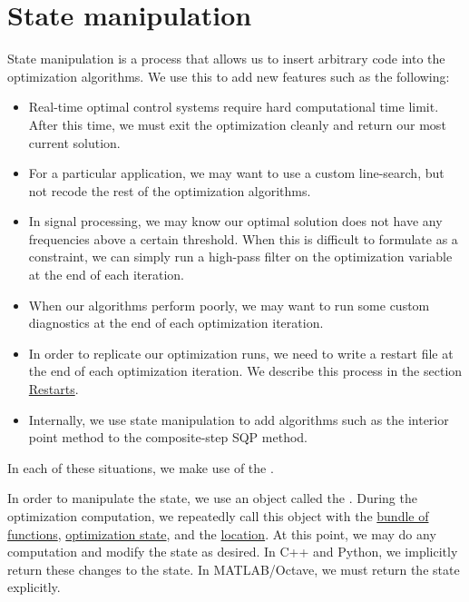 \documentclass{report}
\makeatletter
\DeclareRobustCommand*{\textct}[1]{%
  \begingroup\@activeus\scantokens{\texttt{#1}\endinput}\endgroup}
\newcommand{\textctref}[1]{\hyperref[itm:#1]{\textct{#1}}}
\newcommand{\secsmanip}{State manipulation}
\newcommand{\secrestart}{Restarts}
\makeatother
\begin{document}
\section{\secsmanip}\label{sec:smanip}

        State manipulation is a process that allows us to insert arbitrary code into the optimization algorithms.  We use this to add new features such as the following:
\begin{itemize}
    \item Real-time optimal control systems require hard computational time limit.  After this time, we must exit the optimization cleanly and return our most current solution.
    \item For a particular application, we may want to use a custom line-search, but not recode the rest of the optimization algorithms.
    \item In signal processing, we may know our optimal solution does not have any frequencies above a certain threshold.  When this is difficult to formulate as a constraint, we can simply run a high-pass filter on the optimization variable at the end of each iteration.
    \item When our algorithms perform poorly, we may want to run some custom diagnostics at the end of each optimization iteration.
    \item In order to replicate our optimization runs, we need to write a restart file at the end of each optimization iteration.  We describe this process in the section \hyperref[sec:restart]{\secrestart}.
    \item Internally, we use state manipulation to add algorithms such as the interior point method to the composite-step SQP method.
\end{itemize}
\noindent In each of these situations, we make use of the \textctref{StateManipulator}.

        In order to manipulate the state, we use an object called the \textctref{StateManipulator}.  During the optimization computation, we repeatedly call this object with the \hyperref[sec:fns]{bundle of functions}, \hyperref[sec:state]{optimization state}, and the \hyperref[itm:OptimizationLocation]{location}.  At this point, we may do any computation and modify the state as desired.  In C++ and Python, we implicitly return these changes to the state.  In MATLAB/Octave, we must return the state explicitly.
\end{document}

